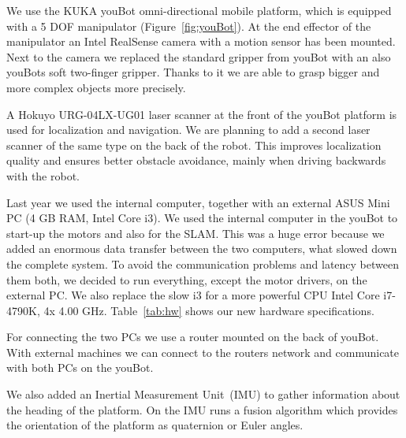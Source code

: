 We use the KUKA youBot omni-directional mobile platform, which is equipped with a 5 DOF manipulator (Figure~\ref{fig:youBot}). At the end effector of the manipulator an Intel RealSense camera with a motion sensor has been mounted. Next to the camera we replaced the standard gripper from youBot with an also youBots soft two-finger gripper. 
Thanks to it we are able to grasp bigger and more complex objects more precisely.

A Hokuyo URG-04LX-UG01 laser scanner at the front of the youBot platform is used for localization and navigation. 
We are planning to add a second laser scanner of the same type on the back of the robot. This improves localization quality and ensures better obstacle avoidance, mainly when driving backwards with the robot.

\newpage
Last year we used the internal computer, together with an external ASUS Mini PC (4 GB RAM, Intel Core i3). We used the internal computer in the youBot to start-up the motors and also for the SLAM. This was a huge error because we added an enormous data transfer between the two computers, what slowed down the complete system. 
To avoid the communication problems and latency between them both, we decided to run everything, except the motor drivers, on the external PC. We also replace the slow i3 for a more powerful CPU Intel Core i7-4790K, 4x 4.00 GHz. Table~\ref{tab:hw} shows our new hardware specifications.

For connecting the two PCs we use a router mounted on the back of youBot. With external machines we can connect to the routers network and communicate with both PCs on the youBot.

We also added an Inertial Measurement Unit~(IMU) to gather information about the heading of the platform. On the IMU runs a fusion algorithm which provides the orientation of the platform as quaternion or Euler angles.

